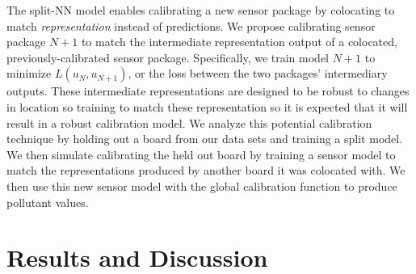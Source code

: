 \documentclass[journal abbreviation, manuscript]{copernicus}
\begin{document}
The split-NN model enables calibrating a new sensor package by colocating to match \textit{representation} instead of predictions.  We propose calibrating sensor package $N+1$ to match the intermediate representation output of a colocated, previously-calibrated sensor package. Specifically, we train model $N + 1$ to minimize $L(u_N, u_{N + 1})$, or the loss between the two packages' intermediary outputs. These intermediate representations are designed to be robust to changes in location so training to match these representation so it is expected that it will result in a robust calibration model. We analyze this potential calibration technique by holding out a board from our data sets and training a split model. We then simulate calibrating the held out board by training a sensor model to match the representations produced by another board it was colocated with. We then use this new sensor model with the global calibration function to produce pollutant values. 


\section{Results and Discussion}
\end{document}
